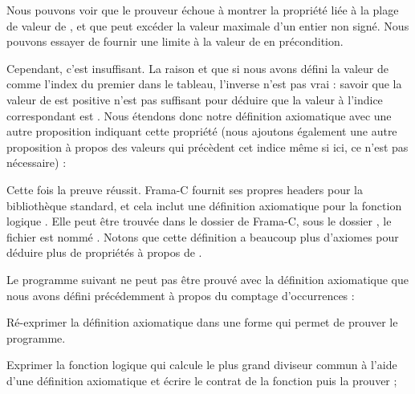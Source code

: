

Nous pouvons voir que le prouveur échoue à montrer la propriété liée à la
plage de valeur de , et que  peut excéder la
valeur maximale d'un entier non signé. Nous pouvons essayer de fournir une
limite à la valeur de  en précondition.




Cependant, c'est insuffisant. La raison et que si nous avons défini la
valeur de  comme l'index du premier
 dans le tableau, l'inverse n'est pas
vrai : savoir que la valeur de  est positive n'est
pas suffisant pour déduire que la valeur à l'indice correspondant est
. Nous étendons donc notre définition
axiomatique avec une autre proposition indiquant cette propriété (nous
ajoutons également une autre proposition à propos des valeurs qui
précèdent cet indice même si ici, ce n'est pas nécessaire) :





Cette fois la preuve réussit. Frama-C fournit ses propres headers pour
la bibliothèque standard, et cela inclut une définition axiomatique pour
la fonction logique . Elle peut être trouvée dans le
dossier de Frama-C, sous le dossier , le fichier est
nommé . Notons que cette définition
a beaucoup plus d'axiomes pour déduire plus de propriétés à propos de
.








Le programme suivant ne peut pas être prouvé avec la définition axiomatique
que nous avons défini précédemment à propos du comptage d'occurrences :




Ré-exprimer la définition axiomatique dans une forme qui permet de prouver le
programme.




Exprimer la fonction logique qui calcule le plus grand diviseur commun à l'aide
d'une définition axiomatique et écrire le contrat de la fonction 
puis la prouver ;


